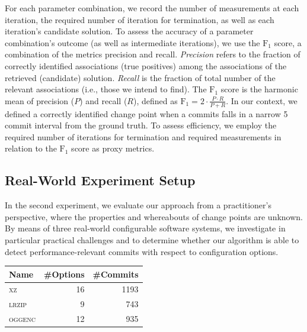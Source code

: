 \documentclass[sigconf]{acmart}
\begin{document}
	For each parameter combination, we record the number of measurements at each iteration, the required number of iteration for termination, as well as each iteration's candidate solution. To assess the accuracy of a parameter combination's outcome (as well as intermediate iterations), we use the $\text{F}_1$ score, a combination of the metrics precision and recall. \emph{Precision} refers to the fraction of correctly identified associations (true positives) among the associations of the retrieved (candidate) solution. \emph{Recall} is the fraction of total number of the relevant associations (i.e., those we intend to find). The $\text{F}_1$ score is the harmonic mean of precision ($P$) and recall ($R$), defined as $\text{F}_1 = 2\cdot\frac{P \cdot R}{P + R}$.	In our context, we defined a correctly identified change point when a commits falls in a narrow 5 commit interval from the ground truth.
	To assess efficiency, we employ the required number of iterations for termination and required measurements in relation to the $\text{F}_1$ score as proxy metrics.
	
	\subsection{Real-World Experiment Setup}
	In the second experiment, we evaluate our approach from a practitioner's perspective, where the properties and whereabouts of change points are unknown.  By means of three real-world configurable software systems, we investigate in particular practical challenges and to determine whether our algorithm is able to detect performance-relevant commits with respect to configuration options. 
	
	\begin{table}
		\centering
		\label{tab:properties}
		\begin{tabular}{lrr}
			\toprule
			\textbf{Name} & \textbf{\#Options} & \textbf{\#Commits}\\
			\midrule
			\textsc{xz} & 16 & 1193\\
			\textsc{lrzip} & 9 & 743 \\
			\textsc{oggenc} & 12 & 935\\
			\bottomrule
		\end{tabular}
	\end{table}
	
\end{document}
